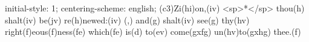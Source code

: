 initial-style: 1;
centering-scheme: english;
(c3)Zi(hi)on,(iv) <sp>*</sp> thou(h) shalt(iv) be(jv) re(h)newed:(iv) (,) and(g) shalt(iv) see(g) thy(hv) right(f)eous(f)ness(fe) which(fe) is(d) to(ev) come(gxfg) un(hv)to(gxhg) thee.(f)
